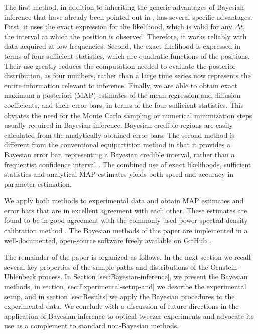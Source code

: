 \documentclass[english,aps, onecolumn, prl,superscriptaddress, notitlepage]{revtex4-1}
\begin{document}
The first method, in addition to inheriting the generic advantages
of Bayesian inference that have already been pointed out in \cite{richly2013calibrating},
has several specific advantages. First, it uses the exact expression
for the likelihood, which is valid for any $\Delta t$, the interval
at which the position is observed. Therefore, it works reliably with
data acquired at low frequencies. Second, the exact likelihood is
expressed in terms of four sufficient statistics, which are quadratic
functions of the positions. Their use greatly reduces the computation
needed to evaluate the posterior distribution, as four numbers, rather
than a large time series now represents the entire information relevant
to inference. Finally, we are able to obtain exact maximum a posteriori
(MAP) estimates of the mean regression and diffusion coefficients,
and their error bars, in terms of the four sufficient statistics.
This obviates the need for the Monte Carlo sampling or numerical minimization
steps usually required in Bayesian inference. Bayesian credible regions
are easily calculated from the analytically obtained error bars. The
second method is different from the conventional equipartition method
in that it provides a Bayesian error bar, representing a Bayesian
credible interval, rather than a frequentist confidence interval \cite{jaynes1976confidence}.
The combined use of exact likelihoods, sufficient statistics and analytical
MAP estimates yields both speed and accuracy in parameter estimation.

We apply both methods to experimental data and obtain MAP estimates
and error bars that are in excellent agreement with each other. These
estimates are found to be in good agreement with the commonly used
power spectral density calibration method \cite{berg2004power}. The
Bayesian methods of this paper are implemented in a well-documented,
open-source software freely available on GitHub \cite{pybisp}.

The remainder of the paper is organized as follows. In the next section
we recall several key properties of the sample paths and distributions
of the Ornstein-Uhlenbeck process. In Section \ref{sec:Bayesian-inference},
we present the Bayesian methods, in section \ref{sec:Experimental-setup-and}
we describe the experimental setup, and in section \ref{sec:Results}
we apply the Bayesian procedures to the experimental data. We conclude
with a discussion of future directions in the application of Bayesian
inference to optical tweezer experiments and advocate its use as a
complement to standard non-Bayesian methods.
\end{document}
